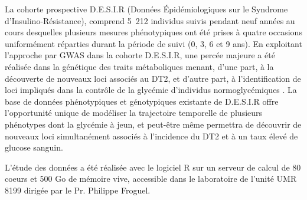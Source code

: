 \documentclass[11pt, a4paper]{article}
\begin{document}
\par{La cohorte prospective D.E.S.I.R (Données Épidémiologiques sur le Syndrome d’Insulino-Résistance)\citep{balkau_epidemiologic_1996},
comprend 5~212 individus suivis pendant neuf années au cours desquelles plusieurs mesures
phénotypiques ont été prises à quatre occasions uniformément réparties durant la période de suivi (0, 3, 6 et 9 ans).
En exploitant l’approche par GWAS dans la cohorte D.E.S.I.R, une percée majeure a été réalisée dans la génétique
des traits métaboliques menant, d’une part, à la découverte de nouveaux loci associés au DT2, et d’autre part,
à l’identification de loci impliqués dans la contrôle de la glycémie d’individus normoglycémiques \citep{dupuis_new_2010, voight_twelve_2010}.
La base de données phénotypiques et génotypiques existante de D.E.S.I.R offre l’opportunité unique de modéliser
la trajectoire temporelle de plusieurs phénotypes dont la glycémie à jeun, et peut-être même permettra
de découvrir de nouveaux loci simultanément associés à l’incidence du DT2 et à un taux élevé de glucose sanguin.}
\par{L’étude des données a été réalisée avec le logiciel R sur un serveur de calcul de 80 coeurs
et 500 Go de mémoire vive, accessible dans le laboratoire de l'unité UMR 8199 dirigée par le Pr. Philippe Froguel.}


\clearpage
\end{document}

